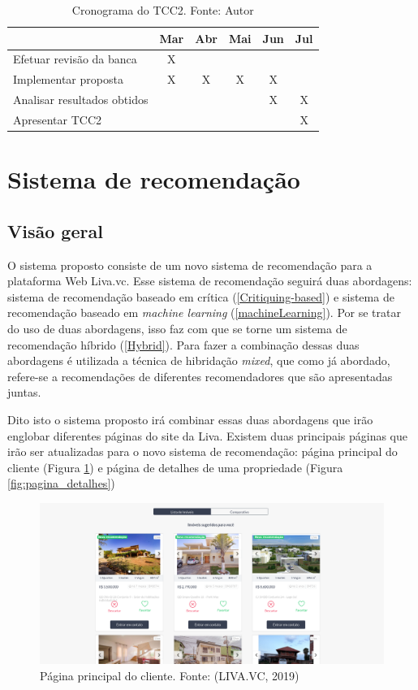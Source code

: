 \begin{table}[H]
\centering
\begin{tabular}{lccccc}
\hline
\textbf{} & \textbf{Mar} & \textbf{Abr} & \textbf{Mai} & \textbf{Jun} & \textbf{Jul} \\ \hline
Efetuar revisão da banca & X &  &  &  &  \\ \hline
Implementar proposta & X & X & X & X &  \\ \hline
Analisar resultados obtidos &  &  &  & X & X \\ \hline
Apresentar TCC2 &  &  &  &  & X \\ \hline
\end{tabular}
\caption[Cronograma do TCC2]{Cronograma do TCC2. Fonte: Autor}
\end{table}

\section{Sistema de recomendação}

\subsection{Visão geral}

O sistema proposto consiste de um novo sistema de recomendação para a plataforma Web Liva.vc. Esse sistema de recomendação seguirá duas abordagens: sistema de recomendação baseado em crítica (\ref{Critiquing-based}) e sistema de recomendação baseado em \textit{machine learning} (\ref{machineLearning}). Por se tratar do uso de duas abordagens, isso faz com que se torne um sistema de recomendação híbrido (\ref{Hybrid}). Para fazer a combinação dessas duas abordagens é utilizada a técnica de hibridação \textit{mixed}, que como já abordado, refere-se a recomendações de diferentes recomendadores que são apresentadas juntas.

Dito isto o sistema proposto irá combinar essas duas abordagens que irão englobar diferentes páginas do site da Liva. Existem duas principais páginas que irão ser atualizadas para o novo sistema de recomendação: página principal do cliente (Figura \ref{fig:pagina_principal}) e página de detalhes de uma propriedade (Figura \ref{fig:pagina_detalhes})

\begin{figure}[H]
    \centering
    \includegraphics[scale=0.33]{figuras/proposta/pagina_principal.png}
    \caption[Página principal do cliente]{Página principal do cliente. Fonte: (LIVA.VC, 2019)}
    \label{fig:pagina_principal}
\end{figure}

